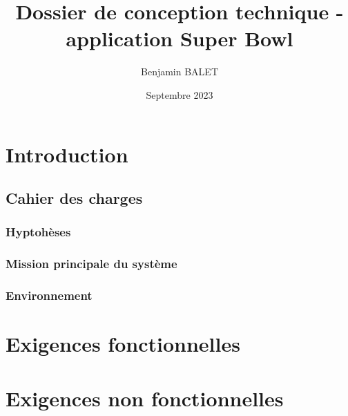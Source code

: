 \documentclass{book}
\title{Dossier de conception technique - application Super Bowl}
\author{Benjamin BALET}
\date{Septembre 2023}
\begin{document}
\maketitle{}
\tableofcontents
\newpage

\chapter{Introduction}

\section{Cahier des charges}

\subsection{Hyptohèses}

\subsection{Mission principale du système}

\subsection{Environnement}

\chapter{Exigences fonctionnelles}


\chapter{Exigences non fonctionnelles}




\begin{appendix}
    \listoffigures
    \listoftables
  \end{appendix}
\end{document}
